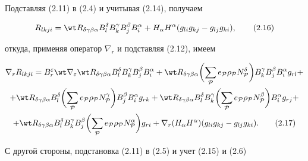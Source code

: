 Подставляя (2.11) в (2.4) и учитывая (2.14), получаем


\begin{equation}


R_{lkji}=\wt R_{\delta\gamma\beta\alpha}B^\delta_l


B^\gamma_k B^\beta_j B^\alpha_i+H_\alpha H^\alpha


(g_{li}g_{kj}-g_{lj}g_{ki}),\tag{2.16}


\end{equation}


откуда, применяя оператор $\nabla_r$ и подставляя (2.12), имеем


\begin{multline}


\nabla_r R_{lkji}=B^\varepsilon_r \wt\nabla_\varepsilon


\wt R_{\delta\gamma\beta\alpha}B^\delta_l B^\gamma_k


B^\beta_j B^\alpha_i +


\wt R_{\delta\gamma\beta\alpha}\biggl(\sum_{\cal P}


e_{\cal P}\rho_{\cal P}N^\delta_{\cal P}\biggr)


B^\gamma_k B^\beta_j B^\alpha_i g_{rl}+ \\


%


+ \wt R_{\delta\gamma\beta\alpha}B^\delta_l


\biggl(\sum_{\cal P}e_{\cal P}\rho_{\cal P}


N^\gamma_{\cal P} \biggr)B^\beta_j B^\alpha_i g_{rk} +


\wt R_{\delta\gamma\beta\alpha}B^\delta_l B^\gamma_k


\biggl(\sum_{\cal P}e_{\cal P}\rho_{\cal P}


N^\beta_{\cal P} \biggr)B^\alpha_i g_{rj}+ \\


%


+ \wt R_{\delta\gamma\beta\alpha}B^\delta_l B^\gamma_k B^\beta_j


\biggl(\sum_{\cal P}e_{\cal P}\rho_{\cal P}


N^\alpha_{\cal P}\biggr)g_{ri}+


\nabla_r(H_\alpha H^\alpha)(g_{li}g_{kj}-


g_{lj}g_{ki}).\tag{2.17}


\end{multline}


С другой стороны, подстановка (2.11) в (2.5) и учет (2.15) и (2.6)


